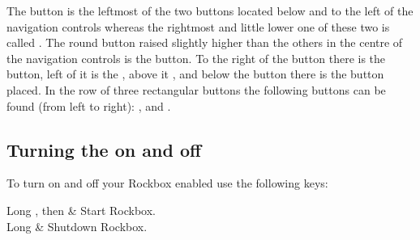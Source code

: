 {{  The \ButtonOn{} button is the leftmost of the two buttons located below and to the
  left of the navigation controls whereas the rightmost and little lower one of
  these two is called \ButtonOff{}. The round button raised slightly higher than the
  others in the centre of the navigation controls is the \ButtonPlay{} button.  To
  the right of the \ButtonPlay{} button  there is the \ButtonRight{} button, left of
  it is the \ButtonLeft{}, above it \ButtonUp{}, and below the \ButtonPlay{} button
  there is the \ButtonDown{} button  placed. In the row of three rectangular buttons
  the following buttons can be found (from left to right): \ButtonFOne{}, \ButtonFTwo{}
  and \ButtonFThree{}.
  }
}

\subsection{Turning the \dap{} on and off}
To turn on and off your Rockbox enabled \dap{} use the following keys:
  \begin{table}
    \begin{btnmap}{}{}
          {Long \ButtonOn}%
       {\ButtonPower{}, then \ButtonHold}%
      & Start Rockbox.\\
          {Long \ButtonPower}%
      & Shutdown Rockbox.\\
    \end{btnmap}
  \end{table}

